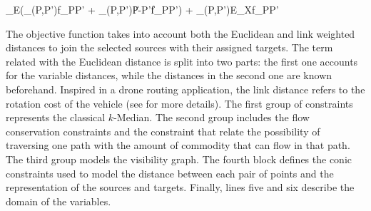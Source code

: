 \documentclass[a4paper,  review, authoryear, 1p.]{elsarticle}
\newcommand{\VB}{{V^{}_{\mathcal B}}}
\newcommand{\EB}{{E^{}_{\mathcal B}}}
\newcommand{\VS}{{V^{}_{\mathcal S}}}
\newcommand{\VT}{{V^{}_{\mathcal T}}}
\newcommand{\EN}{{E^{}_{\mathcal N}}}
\newcommand{\VKMPHN}{{V_{\text{KMPHN}}}}
\newcommand{\EKMPHN}{{E_{\text{KMPHN}}}}
\begin{document}
	
		
		\begin{mini*}[2]
				{}{\omega_E\left(\sum_{(P,P')\in \EN}f_{PP'} + \sum_{(P,P')\in \EB}\|P-P'\|f_{PP'}\right) + \sum_{(P,P')\in E_X}f_{PP'}}
				{}{}\label{form:H-KMPN-single}
				\addConstraint{\eqref{eq:k-median1C}-\eqref{eq:k-median3C}}{}{}
				\addConstraint{\eqref{eq:single-flowC}, \eqref{eq:single-fC}}{}{}
				\addConstraint{\eqref{eq:alphaC},\eqref{eq:deltaC},\eqref{eq:varepsilonC},\eqref{eq:zetaC}, \eqref{eq:etaC}}{}{}
				\addConstraint{\eqref{eq:dC}, \eqref{eq:nC}}{}{}
				\addConstraint{\alpha\in\mathbb Z_2^{\mathcal A}, \delta,\varepsilon\in\mathbb Z_2^{\mathcal D},\zeta\in\mathbb Z_2^{\mathcal Z},\eta\in\mathbb Z_2^{\EN}.}{}{}
		\end{mini*}

		The objective function takes into account both the Euclidean and link weighted distances to join the selected sources with their assigned targets. The term related with the Euclidean distance is split into two parts: the first one accounts for the variable distances, while the distances in the second one are known beforehand. Inspired in a drone routing application, the link distance refers to the rotation cost of the vehicle (see \cite{maheshwari2000} for more details). The first group of constraints represents the classical $k$-Median. The second group includes the flow conservation constraints and the constraint that relate the possibility of traversing one path with the amount of commodity that can flow in that path. The third group models the visibility graph. The fourth block defines the conic constraints used to model the distance between each pair of points and the representation of the sources and targets. Finally, lines five and six describe the domain of the variables.
		
\end{document}
